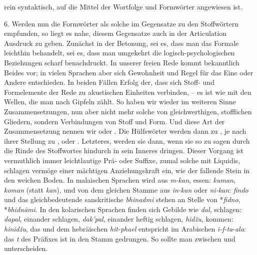 rein syntaktisch, auf die Mittel der Wortfolge und Formwörter angewiesen ist.

\label{IV.III.II.4.6}6. Werden nun die Formwörter als solche im Gegensatze zu den Stoffwörtern empfunden, so liegt es nahe, diesem Gegensatze auch in der Articulation Ausdruck zu geben. Zunächst in der Betonung, sei es, dass man das Formale leichthin behandelt, sei es, dass man umgekehrt die logisch-psychologischen Beziehungen scharf benachdruckt. In unserer freien Rede kommt bekanntlich Beides vor; in vielen Sprachen aber  sich Gewohnheit und Regel für das Eine oder Andere entschieden. In beiden Fällen  Erfolg der, dass sich Stoff- \label{sp.348} und Formelemente der Rede zu akustischen Einheiten verbinden, – es ist wie mit den Wellen, die man nach Gipfeln zählt. So haben wir wieder im weiteren Sinne Zusammensetzungen, nun aber nicht mehr solche von gleichwerthigen, stofflichen Gliedern, sondern Verbindungen von Stoff und Form. Und diese Art der Zusammensetzung nennen wir  oder . Die Hülfswörter werden dann zu , je nach ihrer \label{fp.199} Stellung zu ,  oder . Letzteres,  werden sie dann, wenn sie so zu sagen durch die Rinde des Stoffwortes hindurch in sein Inneres dringen. Dieser Vorgang ist vermuthlich immer  leichtlautige Prä- oder Suffixe, zumal solche mit Liquidis, schlagen vermöge einer mächtigen Anziehungskraft ein, wie der fallende Stein in den weichen Boden. In malaischen Sprachen wird aus \textit{m-kan}, essen: \textit{kuman}, \textit{koman} (statt \textit{kan}), und von dem gleichen Stamme aus \textit{in-kan} oder \textit{ni-kan}:  \textit{findo} und das gleichbedeutende sanskritische \textit{bhinadmi} stehen an Stelle von *\textit{fidno}, *\textit{bhidnāmi}. In den kolarischen Sprachen finden sich Gebilde wie \textit{dal}, schlagen: \textit{dapal}, einander schlagen, \textit{dak’pal}, einander heftig schlagen, \textit{hidžu}, kommen: \textit{hinidžu}, das  und dem hebräischen \textit{hit-pha}{\ain}\textit{el} entspricht im Arabischen \textit{i-f-ta}{}-{\ain}\textit{ala}: das \textit{t} des Präfixes ist in den Stamm gedrungen. So sollte man zwischen  und  unterscheiden.

